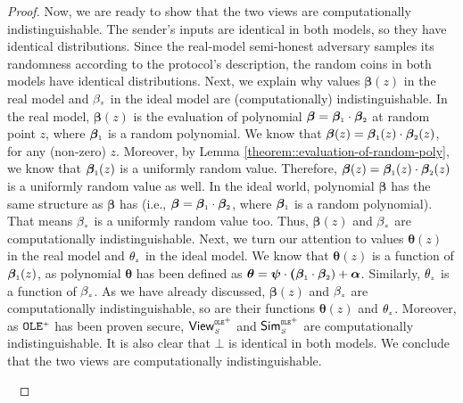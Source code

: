 \begin{proof}
Now, we are ready to show that the two views are computationally indistinguishable. The sender's inputs are identical in both models, so they have identical distributions. Since the real-model semi-honest adversary samples its randomness according to the protocol's description, the random coins in both models have identical distributions.  Next, we explain why values $\bm\beta(z)$ in the real model and $\beta_{\scriptscriptstyle z}$ in the ideal model are (computationally) indistinguishable. In the real model, $\bm\beta(z)$ is the evaluation of polynomial $\bm\beta=\bm\beta_{\scriptscriptstyle 1}\cdot \bm\beta_{\scriptscriptstyle 2}$ at random point $z$, where $\bm\beta_{\scriptscriptstyle 1}$ is a random polynomial. We know that $\bm\beta(z)=\bm\beta_{\scriptscriptstyle 1}(z)\cdot \bm\beta_{\scriptscriptstyle 2}(z)$, for any (non-zero) $z$.  Moreover, by Lemma \ref{theorem::evaluation-of-random-poly}, we know that $\bm\beta_{\scriptscriptstyle 1}(z)$ is a uniformly random value. Therefore, $\bm\beta(z)=\bm\beta_{\scriptscriptstyle 1}(z)\cdot \bm\beta_{\scriptscriptstyle 2}(z)$ is a uniformly random value as well. In the ideal world, polynomial $\bm\beta$ has the same structure as $\bm\beta$ has (i.e., $\bm\beta=\bm\beta_{\scriptscriptstyle 1}\cdot \bm\beta_{\scriptscriptstyle 2}$, where $\bm\beta_{\scriptscriptstyle 1}$ is a random polynomial). That means $\beta_{\scriptscriptstyle z}$ is a uniformly random value too. Thus,  $\bm\beta(z)$ and $\beta_{\scriptscriptstyle z}$ are computationally indistinguishable. Next, we turn our attention to values $\bm\theta(z)$ in the real model and $\theta_{\scriptscriptstyle z}$ in the ideal model. We know that $\bm\theta(z)$ is a function of $\bm\beta_{\scriptscriptstyle 1}(z)$, as polynomial $\bm\theta$ has been defined as $\bm\theta=\bm\psi\cdot \bm(\bm\beta_{\scriptscriptstyle 1}\cdot \bm\beta_{\scriptscriptstyle 2})+\bm\alpha$. Similarly, $\theta_{\scriptscriptstyle z}$ is a function of  $\beta_{\scriptscriptstyle z}$. As we have already discussed,  $\bm\beta(z)$ and $\beta_{\scriptscriptstyle z}$ are computationally indistinguishable, so are their functions $\bm\theta(z)$ and $\theta_{\scriptscriptstyle z}$. Moreover, as  $\mathtt{OLE}^{\scriptscriptstyle +}$ has been proven secure,  $\mathsf{View}^{\scriptscriptstyle \mathtt{OLE}^{\scriptscriptstyle +}}_{\scriptscriptstyle S}$ and  $\mathsf{Sim}^{\scriptscriptstyle \mathtt{OLE}^{\scriptscriptstyle +}}_{\scriptscriptstyle S}$ are computationally indistinguishable. It is also clear that $\bot$ is identical in both models. We conclude that the two views are computationally indistinguishable.


\



\end{proof}
